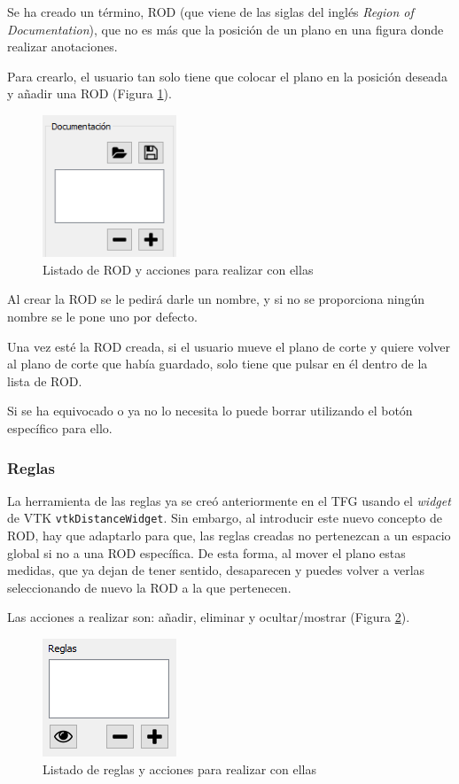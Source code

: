 Se ha creado un término, ROD (que viene de las siglas del inglés \textit{Region of Documentation}), que no es más que la posición de un plano en una figura donde realizar anotaciones.

Para crearlo, el usuario tan solo tiene que colocar el plano en la posición deseada y añadir una ROD (Figura \ref{fig:desarrollo/gui-rod}).

\begin{figure}[H]
	\centering
	\includegraphics[width=4cm]{imagenes/desarrollo/gui-rod}
	\caption{Listado de ROD y acciones para realizar con ellas}
	\label{fig:desarrollo/gui-rod}
\end{figure}

Al crear la ROD se le pedirá darle un nombre, y si no se proporciona ningún nombre se le pone uno por defecto.

Una vez esté la ROD creada, si el usuario mueve el plano de corte y quiere volver al plano de corte que había guardado, solo tiene que pulsar en él dentro de la lista de ROD.

Si se ha equivocado o ya no lo necesita lo puede borrar utilizando el botón específico para ello.

\subsubsection{Reglas}

La herramienta de las reglas ya se creó anteriormente en el TFG usando el \textit{widget} de VTK \texttt{vtkDistanceWidget}. Sin embargo, al introducir este nuevo concepto de ROD, hay que adaptarlo para que, las reglas creadas no pertenezcan a un espacio global si no a una ROD específica. De esta forma, al mover el plano estas medidas, que ya dejan de tener sentido, desaparecen y puedes volver a verlas seleccionando de nuevo la ROD a la que pertenecen.

Las acciones a realizar son: añadir, eliminar y ocultar/mostrar (Figura \ref{fig:desarrollo/gui-reglas}).

\begin{figure}[H]
	\centering
	\includegraphics[width=4cm]{imagenes/desarrollo/gui-reglas}
	\caption{Listado de reglas y acciones para realizar con ellas}
	\label{fig:desarrollo/gui-reglas}
\end{figure}

